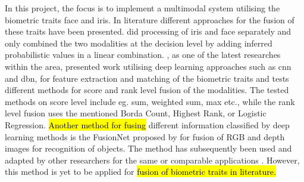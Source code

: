 In this project, the focus is to implement a multimodal system utilising the biometric traits face and iris. In literature different approaches for the fusion of these traits have been presented. \cite{Chen2005a} did processing of iris and face separately and only combined the two modalities at the decision level by adding inferred probabilistic values in a linear combination. \cite{Al-Waisy2017a}, as one of the latest researches within the area, presented work utilising deep learning approaches such as \gls{cnn} and \gls{dbn}, for feature extraction and matching of the biometric traits and tests different methods for score and rank level fusion of the modalities. The tested methods on score level include eg.  sum, weighted sum, max etc., while the rank level fusion uses the mentioned Borda Count, Highest Rank, or Logistic Regression. \hl{Another method for fusing} different information classified by deep learning methods is the FusionNet proposed by \cite{Eitel2015} for fusion of RGB and depth images for recognition of objects. The method has subsequently been used and adapted by other researchers for the same or comparable applications \citep{Aakerberg2017, Li2017}. However, this method is yet to be applied for\hl{ fusion of biometric traits in literature.}

